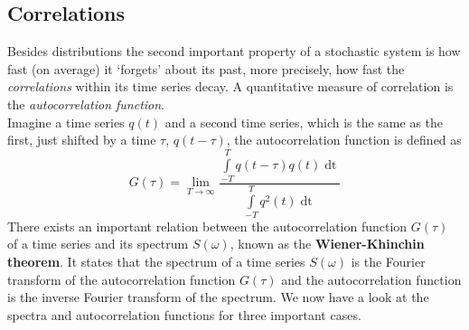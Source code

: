 \subsection{Correlations}
Besides distributions the second important property of a stochastic system is how fast (on average) it ‘forgets’ about its past, more precisely, how fast the \emph{correlations} within its time series decay.
A quantitative measure of correlation is the \emph{autocorrelation function}.\\
Imagine a time series $q(t)$ and a second time series, which is the same as the first, just shifted by a time $\tau$, $q(t-\tau)$, the autocorrelation function is defined as
\begin{equation}
	G(\tau)=\lim_{T\rightarrow\infty}\frac{\int\limits_{-T}^T q(t-\tau)q(t)\mathop{dt}}{\int\limits_{-T}^T q^2(t)\mathop{dt}}
\end{equation}
There exists an important relation between the autocorrelation function $G(\tau)$ of a time series and its spectrum $S(\omega)$, known as the \textbf{Wiener-Khinchin theorem}.
It states that the spectrum of a time series $S(\omega)$ is the Fourier transform of the autocorrelation function $G(\tau)$ and the autocorrelation function is the inverse Fourier transform of the spectrum.
We now have a look at the spectra and autocorrelation functions for three important cases.
